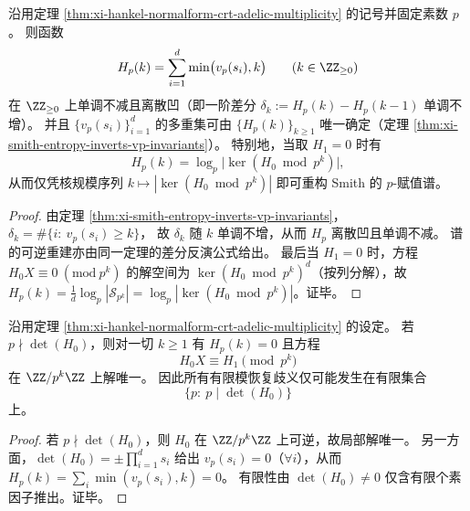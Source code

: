 \begin{proposition}\label{prop:xi-hankel-normalform-hp-discrete-concave-invert}
沿用定理 \ref{thm:xi-hankel-normalform-crt-adelic-multiplicity} 的记号并固定素数 \(p\)。
则函数
\[
H_p(k)=\sum_{i=1}^{d}\min\bigl(v_p(s_i),k\bigr)\qquad(k\in\ZZ_{\ge 0})
\]
在 \(\ZZ_{\ge 0}\) 上单调不减且离散凹（即一阶差分 \(\delta_k:=H_p(k)-H_p(k-1)\) 单调不增）。
并且 \(\{v_p(s_i)\}_{i=1}^{d}\) 的多重集可由 \(\{H_p(k)\}_{k\ge 1}\) 唯一确定（定理 \ref{thm:xi-smith-entropy-inverts-vp-invariants}）。
特别地，当取 \(H_1=0\) 时有
\[
H_p(k)=\log_p\bigl|\ker(H_0\bmod p^k)\bigr|,
\]
从而仅凭核规模序列 \(k\mapsto|\ker(H_0\bmod p^k)|\) 即可重构 Smith 的 \(p\)-赋值谱。
\end{proposition}
\begin{proof}
由定理 \ref{thm:xi-smith-entropy-inverts-vp-invariants}，
\(
\delta_k=\#\{i:\ v_p(s_i)\ge k\}
\)，
故 \(\delta_k\) 随 \(k\) 单调不增，从而 \(H_p\) 离散凹且单调不减。
谱的可逆重建亦由同一定理的差分反演公式给出。
最后当 \(H_1=0\) 时，方程 \(H_0X\equiv 0\ (\mathrm{mod}\ p^k)\) 的解空间为 \(\ker(H_0\bmod p^k)^d\)（按列分解），故
\(
H_p(k)=\frac{1}{d}\log_p|\mathcal S_{p^k}|=\log_p|\ker(H_0\bmod p^k)|
\)。证毕。
\end{proof}

\begin{corollary}\label{cor:xi-hankel-normalform-adelic-ambiguity-finite-support}
沿用定理 \ref{thm:xi-hankel-normalform-crt-adelic-multiplicity} 的设定。
若 \(p\nmid \det(H_0)\)，则对一切 \(k\ge 1\) 有 \(H_p(k)=0\) 且方程
\[
H_0X\equiv H_1\pmod{p^k}
\]
在 \(\ZZ/p^k\ZZ\) 上解唯一。
因此所有有限模恢复歧义仅可能发生在有限集合
\[
\{p:\ p\mid\det(H_0)\}
\]
上。
\end{corollary}
\begin{proof}
若 \(p\nmid \det(H_0)\)，则 \(H_0\) 在 \(\ZZ/p^k\ZZ\) 上可逆，故局部解唯一。
另一方面，\(\det(H_0)=\pm\prod_{i=1}^{d}s_i\) 给出 \(v_p(s_i)=0\)（\(\forall i\)），从而 \(H_p(k)=\sum_i\min(v_p(s_i),k)=0\)。
有限性由 \(\det(H_0)\neq 0\) 仅含有限个素因子推出。证毕。
\end{proof}

\endinput
